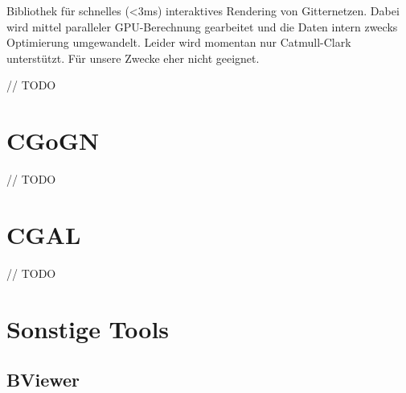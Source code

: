 Bibliothek für schnelles (<3ms) interaktives Rendering von Gitternetzen. Dabei wird mittel paralleler GPU-Berechnung gearbeitet und die Daten intern zwecks Optimierung umgewandelt. Leider wird momentan nur Catmull-Clark unterstützt. Für unsere Zwecke eher nicht geeignet.

// TODO


\section{CGoGN}

// TODO


\section{\acf{CGAL}}

// TODO


\section{Sonstige Tools}


\subsection{BViewer}

